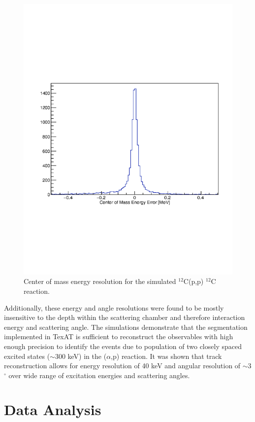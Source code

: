 \documentclass[final,number,sort&compress,5p,times,twocolumn]{elsarticle}
\begin{document}
\begin{figure}[hbt!]
    \centering
     \includegraphics[width=1.0\columnwidth]{Figs/Reconstruction_2}
     \caption{Center of mass energy resolution for the simulated $^{12}$C(p,p) $^{12}$C reaction.}
     \label{fig:Reconstruction_2}
   \end{figure}

Additionally, these energy and angle resolutions were found to be mostly insensitive to the depth within the scattering chamber and therefore interaction energy and scattering angle. The simulations demonstrate that the segmentation implemented in TexAT is sufficient to reconstruct the observables with high enough precision to identify the events due to population of two closely spaced excited states ($\sim$300 keV) in the ($\alpha$,p) reaction. It was shown that track reconstruction allows for energy resolution of 40 keV and angular resolution of $\sim$3$^{\circ}$ over wide range of excitation energies and scattering angles.

\section{Data Analysis}
\end{document}
